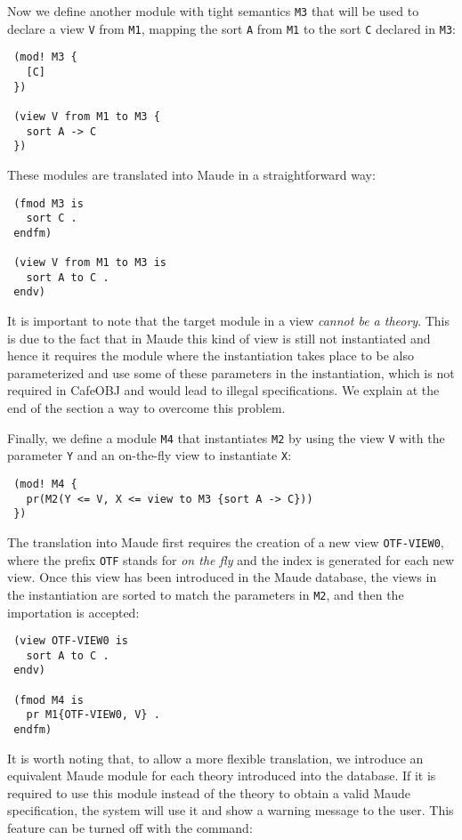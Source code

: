 Now we define another module with tight semantics \verb"M3" that will be used to declare a
view \verb"V" from \verb"M1", mapping the sort \verb"A" from \verb"M1" to the sort
\verb"C" declared in \verb"M3":

{\codesize
\begin{verbatim}
 (mod! M3 {
   [C]
 })

 (view V from M1 to M3 {
   sort A -> C
 })
\end{verbatim}
}

These modules are translated into Maude in a straightforward way:

{\codesize
\begin{verbatim}
 (fmod M3 is
   sort C .
 endfm)

 (view V from M1 to M3 is
   sort A to C .
 endv)
\end{verbatim}
}

It is important to note that
the target module in a view \emph{cannot be a theory}. This is due to the fact that in Maude
this kind of view is still not instantiated and hence it requires the module where the instantiation
takes place to be also parameterized and use some of these parameters in the instantiation,
which is not required in CafeOBJ and would lead to illegal specifications.
%
We explain at the end of the section a way to overcome this problem.

Finally, we define a module \verb"M4" that instantiates \verb"M2" by using the view \verb"V" with
the parameter \verb"Y" and an on-the-fly view to instantiate \verb"X":

{\codesize
\begin{verbatim}
 (mod! M4 {
   pr(M2(Y <= V, X <= view to M3 {sort A -> C}))
 })
\end{verbatim}
}

The translation into Maude first requires the creation of a new view \verb"OTF-VIEW0",
where the prefix \verb"OTF" stands for \emph{on the fly} and the index is generated for each
new view. Once this view has been introduced in the Maude database, the views in the
instantiation are sorted to match the parameters in \verb"M2", and then the importation is
accepted:

{\codesize
\begin{verbatim}
 (view OTF-VIEW0 is
   sort A to C .
 endv)

 (fmod M4 is
   pr M1{OTF-VIEW0, V} .
 endfm)
\end{verbatim}
}

It is worth noting that, 
to allow a more flexible translation, we introduce an equivalent Maude module for each
theory introduced into the database. If it is required to use this module instead of the theory
to obtain a valid Maude specification, the system will use it and show a warning message to the
user. This feature can be turned off with the command:


